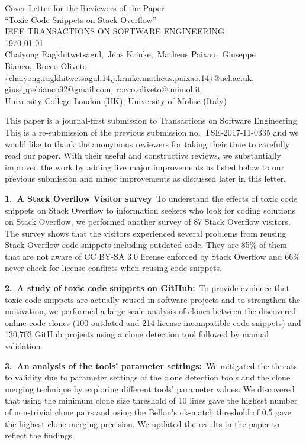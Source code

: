 \documentclass[a4paper,twoside,10pt]{reviewresponse}
\makeatletter
\newcommand{\myAuthors}{Chaiyong Ragkhitwetsagul,~Jens Krinke,~Matheus Paixao,~Giuseppe Bianco,~Rocco Oliveto}
\newcommand{\myEmail}{{chaiyong.ragkhitwetsagul.14,j.krinke,matheus.paixao.14}@ucl.ac.uk, giuseppebianco92@gmail.com, rocco.oliveto@unimol.it}
\newcommand{\myTitle}{Cover Letter for the Reviewers of the Paper \\ ``Toxic Code Snippets on Stack Overflow''}
\newcommand{\myJournal}{IEEE TRANSACTIONS ON SOFTWARE ENGINEERING}
\newcommand{\myDept}{University College London (UK), University of Molise (Italy)}
\makeatother
\begin{document}
\thispagestyle{plain}

\begin{center}
 {\LARGE\myTitle} \vspace{0.3cm} \\
 {\large\myJournal} \vspace{0.3cm} \\
 \today \vspace{0.3cm} \\
 \myAuthors \\
 \url{\myEmail} \\
 \vspace{0.3cm} 
 \myDept \vspace{1cm}
\end{center}


This paper is a journal-first submission to Transactions on Software
Engineering. This is a re-submission of the previous submission
no.~TSE-2017-11-0335 and we would like to thank the anonymous reviewers for
taking their time to carefully read our paper. With their useful and
constructive reviews, we substantially improved the work by adding five major
improvements as listed below to our previous submission and minor improvements
as discussed later in this letter.

\textbf{1.~A Stack Overflow Visitor survey}~To understand the effects of toxic
code snippets on Stack Overflow to information seekers who look for coding
solutions on Stack Overflow, we performed another survey of 87 Stack Overflow
visitors. The survey shows that the visitors experienced several problems from
reusing Stack Overflow code snippets including outdated code. They are 85\% of
them that are not aware of CC BY-SA 3.0 license enforced by Stack Overflow and
66\% never check for license conflicts when reusing code snippets.

\textbf{2.~A study of toxic code snippets on GitHub:}~To provide evidence that
toxic code snippets are actually reused in software projects and to strengthen
the motivation, we performed a large-scale analysis of clones between the
discovered online code clones (100 outdated and 214 license-incompatible code
snippets) and 130,703 GitHub projects using a clone detection tool followed by
manual validation.

\textbf{3.~An analysis of the tools' parameter settings:}~We mitigated the
threats to validity due to parameter settings of the clone detection tools and
the clone merging technique by exploring different tools' parameter values. We
discovered that using the minimum clone size threshold of 10 lines gave the
highest number of non-trivial clone pairs and using the Bellon's ok-match
threshold of 0.5 gave the highest clone merging precision. We updated the
results in the paper to reflect the findings.
\end{document}
